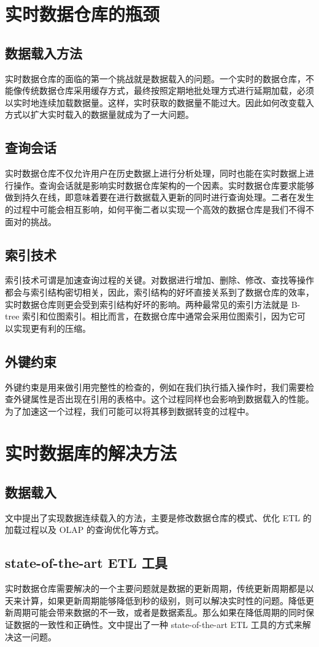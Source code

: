\documentclass[onecolumn,a4paper,10pt]{article}
\begin{document}
\section{实时数据仓库的瓶颈\cite{mc2}}
\subsection{数据载入方法}
实时数据仓库的面临的第一个挑战就是数据载入的问题。一个实时的数据仓库，不能像传统数据仓库采用缓存方式，最终按照定期地批处理方式进行延期加载，必须以实时地连续加载数据量。这样，实时获取的数据量不能过大。因此如何改变载入方式以扩大实时载入的数据量就成为了一大问题。
\subsection{查询会话}
实时数据仓库不仅允许用户在历史数据上进行分析处理，同时也能在实时数据上进行操作。查询会话就是影响实时数据仓库架构的一个因素。实时数据仓库要求能够做到持久在线，即意味着要在进行数据载入更新的同时进行查询处理。二者在发生的过程中可能会相互影响，如何平衡二者以实现一个高效的数据仓库是我们不得不面对的挑战。
\subsection{索引技术}
索引技术可谓是加速查询过程的关键。对数据进行增加、删除、修改、查找等操作都会与索引结构密切相关，因此，索引结构的好坏直接关系到了数据仓库的效率，实时数据仓库则更会受到索引结构好坏的影响。两种最常见的索引方法就是 B-tree 索引和位图索引。相比而言，在数据仓库中通常会采用位图索引，因为它可以实现更有利的压缩。
\subsection{外键约束}
外键约束是用来做引用完整性的检查的，例如在我们执行插入操作时，我们需要检查外键属性是否出现在引用的表格中。这个过程同样也会影响到数据载入的性能。为了加速这一个过程，我们可能可以将其移到数据转变的过程中。

\section{实时数据库的解决方法}
\subsection{数据载入\cite{mc3}}
文中提出了实现数据连续载入的方法，主要是修改数据仓库的模式、优化 ETL 的加载过程以及 OLAP 的查询优化等方式。

\subsection{state-of-the-art ETL 工具\cite{mc4}}
实时数据仓库需要解决的一个主要问题就是数据的更新周期，传统更新周期都是以天来计算，如果更新周期能够降低到秒的级别，则可以解决实时性的问题。降低更新周期可能会带来数据的不一致，或者是数据紊乱。那么如果在降低周期的同时保证数据的一致性和正确性。文中提出了一种 state-of-the-art ETL 工具的方式来解决这一问题。
\end{document}
